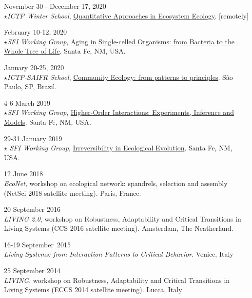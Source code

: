 \documentclass[10pt]{article}
\begin{document}
\begin{outerlist}
    \item November 30 - December 17, 2020 \\
    $\star$\emph{ICTP Winter School}, \href{http://indico.ictp.it/event/9131/}{Quantitative Approaches in Ecosystem Ecology}. [remotely]

 
    \item February 10-12, 2020 \\
    $\star$\emph{SFI Working Group}, \href{https://www.santafe.edu/events/aging-single-celled-organisms-bacteria-whole-tree-}{Aging in Single-celled Organisms: from Bacteria to the Whole Tree of Life}. Santa Fe, NM, USA.

    \item January 20-25, 2020 \\
    $\star$\emph{ICTP-SAIFR School}, \href{https://www.ictp-saifr.org/community-ecology-from-patterns-to-principles/}{Community Ecology: from patterns to principles}. S\~ao Paulo, SP, Brazil.


    \item 4-6 March 2019 \\
	$\star$\emph{SFI Working Group}, \href{https://www.santafe.edu/events/higher-order-interactions-experiments-inference-an}{Higher-Order Interactions: Experiments, Inference and Models}.
    Santa Fe, NM, USA.


    \item 29-31 January 2019 \\
	$\star$ \emph{SFI Working Group}, \href{https://www.santafe.edu/events/irreversibility-ecology}{Irreversibility in Ecological Evolution}. Santa Fe, NM, USA.


    \item 12 June 2018 \\
	\emph{EcoNet}, workshop
    on ecological network: spandrels, selection and assembly (NetSci 2018 satellite meeting). Paris, France.

    \item 20 September 2016 \\
	\emph{LIVING 2.0}, workshop
    on Robustness, Adaptability and Critical Transitions in Living Systems (CCS 2016 satellite meeting). Amsterdam, The Neatherland.


    \item 16-19 September~2015 \\
    \emph{Living Systems: from Interaction Patterns to
    Critical Behavior}. Venice, Italy


    \item  25 September 2014 \\
	 \emph{LIVING}, workshop
    on Robustness, Adaptability and Critical Transitions in Living Systems (ECCS 2014 satellite meeting). Lucca, Italy

\end{outerlist}
\end{document}
